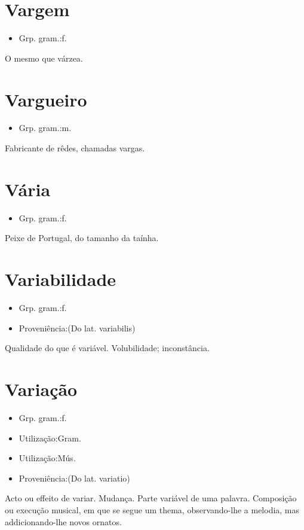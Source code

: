 \documentclass{article}
\begin{document}
\section{Vargem}
\begin{itemize}
\item {Grp. gram.:f.}
\end{itemize}
O mesmo que \textunderscore várzea\textunderscore .
\section{Vargueiro}
\begin{itemize}
\item {Grp. gram.:m.}
\end{itemize}
Fabricante de rêdes, chamadas vargas.
\section{Vária}
\begin{itemize}
\item {Grp. gram.:f.}
\end{itemize}
Peixe de Portugal, do tamanho da taínha.
\section{Variabilidade}
\begin{itemize}
\item {Grp. gram.:f.}
\end{itemize}
\begin{itemize}
\item {Proveniência:(Do lat. \textunderscore variabilis\textunderscore )}
\end{itemize}
Qualidade do que é variável.
Volubilidade; inconstância.
\section{Variação}
\begin{itemize}
\item {Grp. gram.:f.}
\end{itemize}
\begin{itemize}
\item {Utilização:Gram.}
\end{itemize}
\begin{itemize}
\item {Utilização:Mús.}
\end{itemize}
\begin{itemize}
\item {Proveniência:(Do lat. \textunderscore variatio\textunderscore )}
\end{itemize}
Acto ou effeito de variar.
Mudança.
Parte variável de uma palavra.
Composição ou execução musical, em que se segue um thema, observando-lhe a melodia, mas addicionando-lhe novos ornatos.
\end{document}
